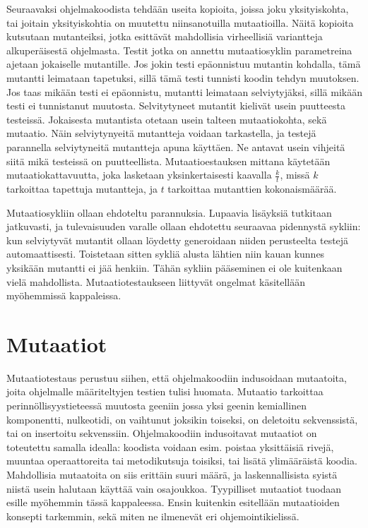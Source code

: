 \documentclass{tktltiki}
\begin{document}
Seuraavaksi ohjelmakoodista tehdään useita kopioita, joissa joku yksityiskohta, tai joitain yksityiskohtia on muutettu niinsanotuilla mutaatioilla. Näitä kopioita kutsutaan mutanteiksi, jotka esittävät mahdollisia virheellisiä variantteja alkuperäisestä ohjelmasta. Testit jotka on annettu mutaatiosyklin parametreina ajetaan jokaiselle mutantille. Jos jokin testi epäonnistuu mutantin kohdalla, tämä mutantti leimataan tapetuksi, sillä tämä testi tunnisti koodin tehdyn muutoksen. Jos taas mikään testi ei epäonnistu, mutantti leimataan selviytyjäksi, sillä mikään testi ei tunnistanut muutosta. Selvitytyneet mutantit kielivät usein puutteesta testeissä. Jokaisesta mutantista otetaan usein talteen mutaatiokohta, sekä mutaatio. Näin selviytynyeitä mutantteja voidaan tarkastella, ja testejä parannella selviytyneitä mutantteja apuna käyttäen. Ne antavat usein vihjeitä siitä mikä testeissä on puutteellista. Mutaatioestauksen mittana käytetään mutaatiokattavuutta, joka lasketaan yksinkertaisesti kaavalla $\frac{k}{t}$, missä $k$ tarkoittaa tapettuja mutantteja, ja $t$ tarkoittaa mutanttien kokonaismäärää.

Mutaatiosykliin ollaan ehdoteltu parannuksia. Lupaavia lisäyksiä tutkitaan jatkuvasti, ja tulevaisuuden varalle ollaan ehdotettu seuraavaa pidennystä sykliin: kun selviytyvät mutantit ollaan löydetty generoidaan niiden perusteelta testejä automaattisesti. Toistetaan sitten sykliä alusta lähtien niin kauan kunnes yksikään mutantti ei jää henkiin. Tähän sykliin pääseminen ei ole kuitenkaan vielä mahdollista. Mutaatiotestaukseen liittyvät ongelmat käsitellään myöhemmissä kappaleissa.

\section{Mutaatiot}
Mutaatiotestaus perustuu siihen, että ohjelmakoodiin indusoidaan mutaatoita, joita ohjelmalle määriteltyjen testien tulisi huomata. Mutaatio tarkoittaa perinnöllisyystieteessä muutosta geeniin jossa yksi geenin kemiallinen komponentti, nulkeotidi, on vaihtunut joksikin toiseksi, on deletoitu sekvenssistä, tai on insertoitu sekvenssiin. Ohjelmakoodiin indusoitavat mutaatiot on toteutettu samalla idealla: koodista voidaan esim. poistaa yksittäisiä rivejä, muuntaa operaattoreita tai metodikutsuja toisiksi, tai lisätä ylimääräistä koodia. Mahdollisia mutaatoita on siis erittäin suuri määrä, ja laskennallisista syistä niistä usein halutaan käyttää vain osajoukkoa. Tyypilliset mutaatiot tuodaan esille myöhemmin tässä kappaleessa. Ensin kuitenkin esitellään mutaatioiden konsepti tarkemmin, sekä miten ne ilmenevät eri ohjemointikielissä.
\end{document}
